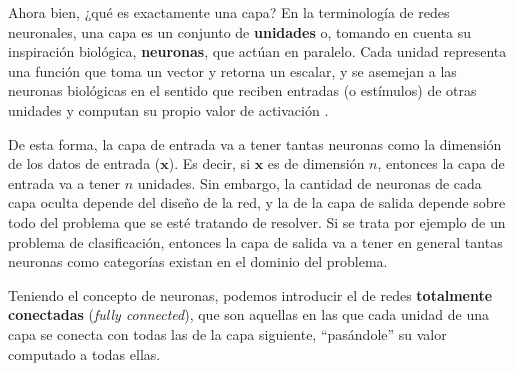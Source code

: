 \documentclass[../../main.tex]{subfiles}
\begin{document}
Ahora bien, ¿qué es exactamente una capa? En la terminología de redes neuronales, una capa
es un conjunto de \textbf{unidades} o, tomando en cuenta su inspiración biológica,
\textbf{neuronas}, que actúan en paralelo. Cada unidad representa una función que toma un
vector y retorna un escalar, y se asemejan a las neuronas biológicas en el sentido que
reciben entradas (o estímulos) de otras unidades y computan su propio valor de activación
\cite{deep-learning}.

De esta forma, la capa de entrada va a tener tantas neuronas como la dimensión de los
datos de entrada (\(\bm{x}\)). Es decir, si \(\bm{x}\) es de dimensión \(n\), entonces la
capa de entrada va a tener \(n\) unidades. Sin embargo, la cantidad de neuronas de cada
capa oculta depende del diseño de la red, y la de la capa de salida depende sobre todo del
problema que se esté tratando de resolver. Si se trata por ejemplo de un problema de
clasificación, entonces la capa de salida va a tener en general tantas neuronas como
categorías existan en el dominio del problema.

Teniendo el concepto de neuronas, podemos introducir el de redes \textbf{totalmente
conectadas} (\textit{fully connected}), que son aquellas en las que cada unidad de una
capa se conecta con todas las de la capa siguiente, ``pasándole'' su valor computado
a todas ellas.
\end{document}
